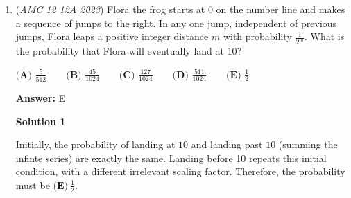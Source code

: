 \begin{enumerate}
 



\textbf{Solution 6}

$z^2+z+1$ reminds me of $(z-1)(z^2+z+1)=z^3-1$.Complex numbers $z$ that satisfies $|1+z+z^{2}|=4$ either comply to $1+z+z^{2}=4$ or $1+z+z^{2}=-4$.In another words, complex numbers $z$ that satisfy $(z-1)(z^2+z+1)=4(z-1)$ or $(z-1)(z^2+z+1)=-4(z-1)$ corresponds to complex numbers $z$ that satisfies $|1+z+z^{2}|=4$.

 \textbf{Case I: $(z-1)(z^2+z+1)=4(z-1)$} $(z-1)(z^2+z+1)=4(z-1)$ could be rewritten as $z^3-1=4(z-1)$.
 \[z^3-4z+3=0\]By substituting 1 for $z$ and using synthetic division, it is evident that $z^3-4z+3=(z-1)(z^2+z-3)=0$.
 \[z=1 \text{ or } z=\frac{-1\pm\sqrt{13}}{2}\]

 \textbf{Case II: $(z-1)(z^2+z+1)=-4(z-1)$} $(z-1)(z^2+z+1)=-4(z-1)$ could be rewritten as $z^3-1=-4(z-1)$.
 \[z^3+4z-5=0\]By substituting 1 for $z$ and using synthetic division, it is evident that $z^3+4z-5=(z-1)(z^2+z+5)=0$.
 \[z=1 \text{ or } z=\frac{-1\pm\sqrt{-19}}{2}\]

 \textbf{Determining the Maximum Value of the Imaginary Part of $z$} It is important to note the 1 cannot be a value for $z$ because while multiplying $(z-1)$ to both sides, 1 became a solution for $z$. Therefore, four values for possible $z$ are $\frac{-1\pm\sqrt{13}}{2} \text{ and } \frac{-1\pm\sqrt{-19}}{2}$.Because $m$ and $n$ are positive integers, the only possible value for $m+n$ is $19+2$, or $\boxed{(B) \text{ } 21}$.~MaPhyCom

 


 


	\item (\textit{AMC 12 12A 2023}) Flora the frog starts at $0$ on the number line and makes a sequence of jumps to the right. In any one jump, independent of previous jumps, Flora leaps a positive integer distance $m$ with probability $\frac{1}{2^m}$. What is the probability that Flora will eventually land at $10$?


 $\textbf{(A) } \frac{5}{512} \qquad \textbf{(B) } \frac{45}{1024} \qquad \textbf{(C) } \frac{127}{1024} \qquad \textbf{(D) } \frac{511}{1024} \qquad \textbf{(E) } \frac{1}{2}$

 \textbf{Answer: }E



\textbf{Solution 1}

Initially, the probability of landing at $10$ and landing past $10$ (summing the infinte series) are exactly the same. Landing before 10 repeats this initial condition, with a different irrelevant scaling factor. Therefore, the probability must be $\boxed{\textbf{(E)}~\frac12}$.


\end{enumerate}
